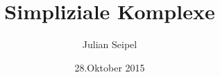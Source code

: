 \subject{Seminar: Simpliziale Topologie}
\title{Simpliziale Komplexe}
\author{Julian Seipel}
\date{28.Oktober 2015}

\maketitle
\thispagestyle{empty}

\newpage
